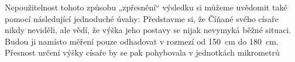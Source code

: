 \begin{mdframed}[style=mdexam]
\begin{example}
      Nepoužitelnost tohoto způsobu „zpřesnění“ výsledku si můžeme uvědomit také pomocí následující
      jednoduché úvahy: Představme si, že Číňané svého císaře nikdy neviděli, ale vědí, že výška
      jeho postavy se nijak nevymyká běžné situaci. Budou ji namísto měření pouze odhadovat v
      rozmezí od \qty{150}{\cm} do \qty{180}{\cm}. Přesnost určení výšky císaře by se pak pohybovala v
      jednotkách mikrometrů
  \end{example}
\end{mdframed}
